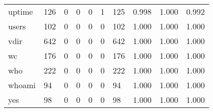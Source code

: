 \begin{longtable}{lp{2.0cm}p{2.0cm}p{2.0cm}p{2.0cm}p{2.0cm}p{2.0cm}p{2.0cm}p{2.0cm}p{2.0cm}}
uptime    &                    126 &                                  0 &                                 0 &                                0 &                                 1 &                             125 &                                0.998 &                                  1.000 &                                0.992 \\
users     &                    102 &                                  0 &                                 0 &                                0 &                                 0 &                             102 &                                1.000 &                                  1.000 &                                1.000 \\
vdir      &                    642 &                                  0 &                                 0 &                                0 &                                 0 &                             642 &                                1.000 &                                  1.000 &                                1.000 \\
wc        &                    176 &                                  0 &                                 0 &                                0 &                                 0 &                             176 &                                1.000 &                                  1.000 &                                1.000 \\
who       &                    222 &                                  0 &                                 0 &                                0 &                                 0 &                             222 &                                1.000 &                                  1.000 &                                1.000 \\
whoami    &                     94 &                                  0 &                                 0 &                                0 &                                 0 &                              94 &                                1.000 &                                  1.000 &                                1.000 \\
yes       &                     98 &                                  0 &                                 0 &                                0 &                                 0 &                              98 &                                1.000 &                                  1.000 &                                1.000 \\
\end{longtable}
